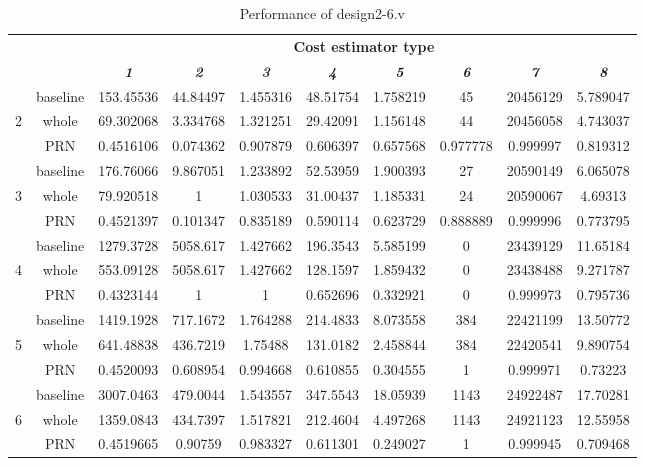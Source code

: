 \documentclass[conference]{IEEEtran}
\begin{document}
\begin{table}[htbp]
\caption{Performance of design2-6.v}
\begin{center}
\begin{tabular}{|c|c|c|c|c|c|c|c|c|c|}
\hline
&\textbf{}&\multicolumn{8}{|c|}{\textbf{Cost estimator type}} \\
\cline{3-10}
\textbf{} & 
\textbf{} & 
\textbf{\textit{1}}& 
\textbf{\textit{2}}&
\textbf{\textit{3}}&
\textbf{\textit{4}}&
\textbf{\textit{5}}&
\textbf{\textit{6}}&
\textbf{\textit{7}}&
\textbf{\textit{8}} \\
\cline{1-10}
  & baseline & 153.45536 & 44.84497 & 1.455316 & 48.51754 & 1.758219 & 45       & 20456129 & 5.789047 \\
\cline{2-10}
2 & whole    & 69.302068 & 3.334768 & 1.321251 & 29.42091 & 1.156148 & 44       & 20456058 & 4.743037 \\
\cline{2-10}
  & PRN      & 0.4516106 & 0.074362 & 0.907879 & 0.606397 & 0.657568 & 0.977778 & 0.999997 & 0.819312 \\
\hline
  & baseline & 176.76066 & 9.867051 & 1.233892 & 52.53959 & 1.900393 & 27       & 20590149 & 6.065078 \\
\cline{2-10}
3 & whole    & 79.920518 & 1        & 1.030533 & 31.00437 & 1.185331 & 24       & 20590067 & 4.69313  \\
\cline{2-10}
  & PRN      & 0.4521397 & 0.101347 & 0.835189 & 0.590114 & 0.623729 & 0.888889 & 0.999996 & 0.773795 \\
\hline
  & baseline & 1279.3728 & 5058.617 & 1.427662 & 196.3543 & 5.585199 & 0        & 23439129 & 11.65184 \\
\cline{2-10}  
4 & whole    & 553.09128 & 5058.617 & 1.427662 & 128.1597 & 1.859432 & 0        & 23438488 & 9.271787 \\
\cline{2-10}
  & PRN      & 0.4323144 & 1        & 1        & 0.652696 & 0.332921 & 0        & 0.999973 & 0.795736 \\
\hline
  & baseline & 1419.1928 & 717.1672 & 1.764288 & 214.4833 & 8.073558 & 384      & 22421199 & 13.50772 \\
\cline{2-10}  
5 & whole    & 641.48838 & 436.7219 & 1.75488  & 131.0182 & 2.458844 & 384      & 22420541 & 9.890754 \\
\cline{2-10}
  & PRN      & 0.4520093 & 0.608954 & 0.994668 & 0.610855 & 0.304555 & 1        & 0.999971 & 0.73223  \\
\hline
  & baseline & 3007.0463 & 479.0044 & 1.543557 & 347.5543 & 18.05939 & 1143     & 24922487 & 17.70281 \\
\cline{2-10}
6 & whole    & 1359.0843 & 434.7397 & 1.517821 & 212.4604 & 4.497268 & 1143     & 24921123 & 12.55958 \\
\cline{2-10}
  & PRN      & 0.4519665 & 0.90759  & 0.983327 & 0.611301 & 0.249027 & 1        & 0.999945 & 0.709468 \\
\hline


\end{tabular}
\label{tab1}
\end{center}
\end{table}
\end{document}
